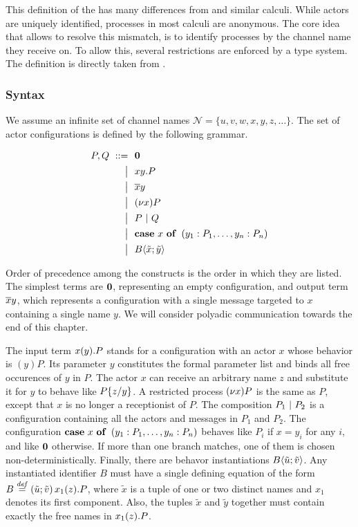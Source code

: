 This definition of the \actormodel has many differences from
\joincalc and similar calculi.
While actors are uniquely identified,
processes in most calculi are anonymous.
The core idea that allows \actorpicalc to resolve this mismatch,
is to identify processes by the channel name they receive on.
To allow this, several restrictions are enforced by a type system.
The definition is directly taken from \cite{agha_algebraic_2004}.

\subsubsection{Syntax}

We assume an infinite set of channel names
$ \mathcal{N} = \{u, v, w, x, y, z, \ldots\} $.
The set of actor configurations is defined by the following grammar.

\begin{align*}
  P, Q
  \grmr \anullproc
  \altn \amrcv{x}{y} . P
  \altn \amsnd{x}{y}
  \altn \anew{x}{P}
  \altn P \apar Q
  \altn \acse{x}{\aalt{y_1}{P_1}, \dots, \aalt{y_n}{P_n}}
  \altn \ains{B}{\tilde{x}}{\tilde{y}}
\end{align*}

Order of precedence among the constructs is the order in which they are
listed.
The simplest terms are $\textbf{\textup{0}}$, representing an empty configuration,
and output term $\overline{x} y$, which represents a configuration with a single message
targeted to $x$ containing a single name $y$.
We will consider polyadic communication towards the end of this chapter.

The input term $x(y) . P$ stands for a configuration with an actor
$x$ whose behavior is $(y) P$.
Its parameter $y$ constitutes the formal parameter list and binds all
free occurences of $y$ in $P$.
The actor $x$ can receive an arbitrary name $z$
and substitute it for $y$ to behave like $P \{ z / y \}$.
A restricted process $\anew{x}{P}$ is the same as $P$,
except that $x$ is no longer a receptionist of $P$.
The composition $P_1 \ |\  P_2$ is a configuration containing
all the actors and messages in $P_1$ and $P_2$.
The configuration
$\acse{x}{\aalt{y_1}{P_1}, \ldots, \aalt{y_n}{P_n}}$
behaves like $P_i$ if $x = y_i$ for any $i$,
and like $\textbf{\textup{0}}$ otherwise.
If more than one branch matches, one of them is chosen non-deterministically.
Finally, there are behavor instantiations
$B \langle \tilde{u} ; \tilde{v} \rangle$.
Any instantiated identifier $B$ must have a single defining equation of the form
$\adef{B}{\tilde{u}}{\tilde{v}}{\arcv{x_1}{z} . P}$,
where $\tilde{x}$ is a tuple of one or two distinct names
and $x_1$ denotes its first component.
Also, the tuples $\tilde{x}$ and $\tilde{y}$ together must contain
exactly the free names in $x_1(z) . P$.


